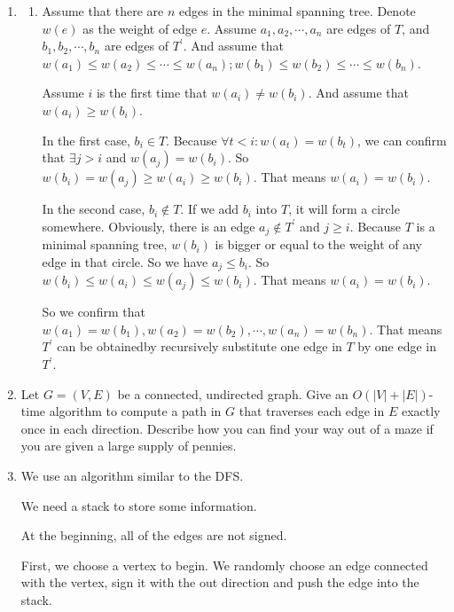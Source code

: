 \documentclass[12pt,a4paper]{article}
\makeatletter
\newtheorem*{solution}{Solution}
\theoremstyle{definition}
\renewenvironment{solution}[1][Solution] {\par\pushQED{\qed}\normalfont\topsep6\p@\@plus6\p@\relax\trivlist\item[\hskip\labelsep\bfseries#1\@addpunct{.}]\ignorespaces}{\popQED\endtrivlist\@endpefalse} \makeatother
\makeatother
\begin{document}
\begin{enumerate}
\begin{solution}
\begin{enumerate}
	\item Assume that there are $n$ edges in the minimal spanning tree. Denote $ w(e) $ as the weight of edge $ e $. 
	Assume $ a_{1}, a_{2}, \cdots, a_{n} $ are edges of $ T $, and  $ b_{1}, b_{2}, \cdots, b_{n} $ are edges of $ T^{\prime} $. And assume that $ w(a_{1}) \leqslant w(a_{2}) \leqslant \cdots \leqslant w(a_{n}); w(b_{1}) \leqslant w(b_{2}) \leqslant \cdots \leqslant w(b_{n}) $. 

	Assume $ i $ is the first time that $ w(a_i) \neq w(b_i) $. And assume that $ w(a_i) \geqslant w(b_i) $.

	In the first case, $ b_{i} \in T $. Because $ \forall t < i : w(a_{t}) = w(b_{t}) $, we can confirm that $ \exists j>i $ and $ w(a_{j}) = w(b_{i}) $. So $ w(b_{i}) = w(a_{j}) \geqslant w(a_{i}) \geqslant w(b_{i})$. That means $ w(a_{i}) = w(b_{i}) $.

	In the second case, $ b_{i} \notin T $. If we add $ b_{i} $ into $ T $, it will form a circle somewhere. Obviously, there is an edge $ a_{j} \notin T^{\prime}$ and $j \geqslant i$. Because $ T $ is a minimal spanning tree, $ w(b_{i}) $ is bigger or equal to the weight of any edge in that circle. So we have $ a_{j} \leqslant b_{i} $. So $ w(b_{i}) \leqslant w(a_{i})  \leqslant w(a_{j}) \leqslant w(b_{i})$. That means $ w(a_{i}) = w(b_{i}) $.

	So we confirm that $ w(a_{1}) = w(b_{1}), w(a_{2}) = w(b_{2}), \cdots, w(a_{n}) = w(b_{n}) $. That means $ T^\prime $ can be obtainedby recursively substitute one edge in $ T $ by one edge in $ T^\prime $.
	
	\end{enumerate}
	\end{solution}

    \item Let $G=(V,E)$ be a connected, undirected graph. Give an $O(|V|+|E|)$-time algorithm
    to compute a path in $G$ that traverses each edge in $E$ exactly once in each direction. Describe how you can find your way out of a maze if you are given a large supply of pennies.

	\begin{solution}
		We use an algorithm similar to the DFS. 
		
		We need a stack to store some information.

		At the beginning, all of the edges are not signed. 
		
		First, we choose a vertex to begin. We randomly choose an edge connected with the vertex, sign it with the out direction and push the edge into the stack. 
		

\end{solution}
\end{enumerate}
\end{document}
